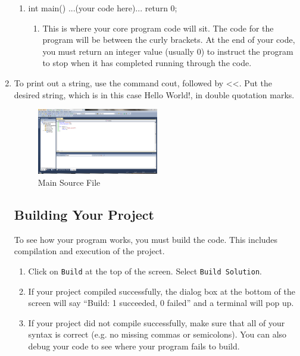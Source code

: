 \documentclass[twocolumn]{article}
\begin{document}
\begin{enumerate}
\begin{enumerate}
	  \item int main() {...(your code here)... return 0;}
	\begin{enumerate}
	  \item This is where your core program code will sit. The code for the program will be between the curly brackets. At the end of your code, you must return an integer value (usually 0) to instruct the program to stop when it has completed running through the code.
	\end{enumerate}
	\end{enumerate}
	\item To print out a string, use the command cout, followed by <<. Put the desired string, which is in this case Hello World!, in double quotation marks. 
	\begin{figure}[htbp]
		\centering
		\includegraphics[width=0.5\textwidth]{4.png}
		\caption{Main Source File}
		\label{fig:main}
	\end{figure}
	
\subsection{Building Your Project} To see how your program works, you must build the code. This includes compilation and execution of the project.
\begin{enumerate}
  \item Click on \texttt{Build} at the top of the screen. Select \texttt{Build Solution}. 
  \item If your project compiled successfully, the dialog box at the bottom of the screen will say “Build: 1 succeeded, 0 failed” and a terminal will pop up.
	\item If your project did not compile successfully, make sure that all of your syntax is correct (e.g. no missing commas or semicolons). You can also debug your code to see where your program fails to build.
	

\end{enumerate}
\end{enumerate}
\end{document}
